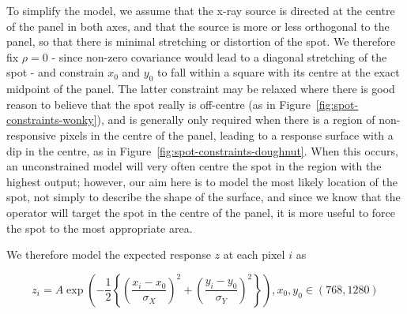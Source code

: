 \documentclass[\main/IO-Pixels.tex]{subfiles}
\begin{document}
To simplify the model, we assume that the x-ray source is directed at the centre of the panel in both axes, and that the source is more or less orthogonal to the panel, so that there is minimal stretching or distortion of the spot. We therefore fix $\rho = 0$ - since non-zero covariance would lead to a diagonal stretching of the spot - and constrain $x_0$ and $y_0$ to fall within a square with its centre at the exact midpoint of the panel. The latter constraint may be relaxed where there is good reason to believe that the spot really is off-centre (as in Figure~\ref{fig:spot-constraints-wonky}), and is generally only required when there is a region of non-responsive pixels in the centre of the panel, leading to a response surface with a dip in the centre, as in Figure~\ref{fig:spot-constraints-doughnut}. When this occurs, an unconstrained model will very often centre the spot in the region with the highest output; however, our aim here is to model the most likely location of the spot, not simply to describe the shape of the surface, and since we know that the operator will target the spot in the centre of the panel, it is more useful to force the spot to the most appropriate area. 

We therefore model the expected response $z$ at each pixel $i$ as

\[ z_i = A \exp \left(-\frac{1}{2} \left\lbrace \left(\frac{x_i - x_0}{\sigma_X}\right)^2 + \left(\frac{y_i - y_0}{\sigma_Y}\right)^2 \right\rbrace \right) , x_0, y_0 \in (768, 1280) \]
\end{document}
